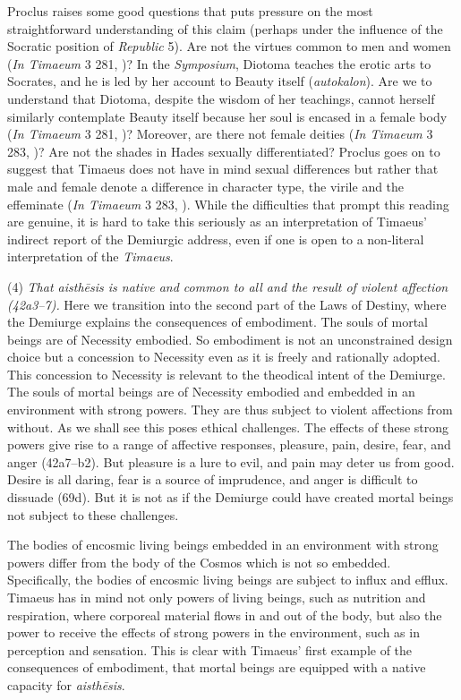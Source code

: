 Proclus raises some good questions that puts pressure on the most straightforward understanding of this claim (perhaps under the influence of the Socratic position of \emph{Republic} 5). Are not the virtues common to men and women (\emph{In Timaeum} 3 281, \citealt{Diehl:1903re})? In the \emph{Symposium}, Diotoma teaches the erotic arts to Socrates, and he is led by her account to Beauty itself (\emph{autokalon}). Are we to understand that Diotoma, despite the wisdom of her teachings, cannot herself similarly contemplate Beauty itself because her soul is encased in a female body (\emph{In Timaeum} 3 281, \citealt{Diehl:1903re})? Moreover, are there not female deities (\emph{In Timaeum} 3 283, \citealt{Diehl:1903re})? Are not the shades in Hades sexually differentiated? Proclus goes on to suggest that Timaeus does not have in mind sexual differences but rather that male and female denote a difference in character type, the virile and the effeminate (\emph{In Timaeum} 3 283, \citealt{Diehl:1903re}). While the difficulties that prompt this reading are genuine, it is hard to take this seriously as an interpretation of Timaeus' indirect report of the Demiurgic address, even if one is open to a non-literal interpretation of the \emph{Timaeus}.

(4) \emph{That \emph{aisthēsis} is native and common to all and the result of violent affection (42a3--7).} Here we transition into the second part of the Laws of Destiny, where the Demiurge explains the consequences of embodiment. The souls of mortal beings are of Necessity embodied. So embodiment is not an unconstrained design choice but a concession to Necessity even as it is freely and rationally adopted. This concession to Necessity is relevant to the theodical intent of the Demiurge. The souls of mortal beings are of Necessity embodied and embedded in an environment with strong powers. They are thus subject to violent affections from without. As we shall see this poses ethical challenges. The effects of these strong powers give rise to a range of affective responses, pleasure, pain, desire, fear, and anger (42a7--b2). But pleasure is a lure to evil, and pain may deter us from good. Desire is all daring, fear is a source of imprudence, and anger is difficult to dissuade (69d). But it is not as if the Demiurge could have created mortal beings not subject to these challenges.

The bodies of encosmic living beings embedded in an environment with strong powers differ from the body of the Cosmos which is not so embedded. Specifically, the bodies of encosmic living beings are subject to influx and efflux. Timaeus has in mind not only powers of living beings, such as nutrition and respiration, where corporeal material flows in and out of the body, but also the power to receive the effects of strong powers in the environment, such as in perception and sensation. This is clear with Timaeus' first example of the consequences of embodiment, that mortal beings are equipped with a native capacity for \emph{aisthēsis}.

